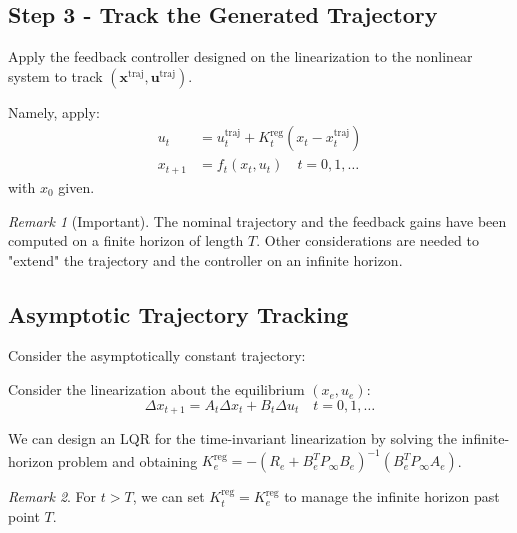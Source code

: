 \documentclass[openany]{book}
\theoremstyle{definition}
\theoremstyle{remark}
\newtheorem*{remark}{Remark}
\begin{document}
\subsection{Step 3 - Track the Generated Trajectory}
Apply the feedback controller designed on the linearization to the nonlinear system to track $(\mathbf{x}^{\text{traj}}, \mathbf{u}^{\text{traj}})$. 

Namely, apply:
\begin{align*}
    u_t &= u_t^{\text{traj}} + K_t^{\text{reg}}(x_t - x_t^{\text{traj}}) \\
    x_{t+1} &= f_t(x_t, u_t) \quad t = 0,1,\ldots
\end{align*}
with $x_0$ given.

\begin{remark}[Important]
The nominal trajectory and the feedback gains have been computed on a finite horizon of length $T$. Other considerations are needed to "extend" the trajectory and the controller on an infinite horizon.
\end{remark}

\subsection{Asymptotic Trajectory Tracking}
Consider the asymptotically constant trajectory:
\begin{center}
\end{center}

Consider the linearization about the equilibrium $(x_e, u_e)$:
\[
    \Delta x_{t+1} = A_t\Delta x_t + B_t\Delta u_t \quad t = 0,1,\ldots
\]

We can design an LQR for the time-invariant linearization by solving the infinite-horizon problem and obtaining $K_e^{\text{reg}} = -(R_e + B_e^T P_\infty B_e)^{-1}(B_e^T P_\infty A_e)$.

\begin{remark}
For $t > T$, we can set $K_t^{\text{reg}} = K_e^{\text{reg}}$ to manage the infinite horizon past point $T$.
\end{remark}
\end{document}
